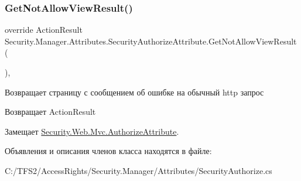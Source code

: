\subsubsection{\texorpdfstring{Get\+Not\+Allow\+View\+Result()}{GetNotAllowViewResult()}}
{\footnotesize\ttfamily override Action\+Result Security.\+Manager.\+Attributes.\+Security\+Authorize\+Attribute.\+Get\+Not\+Allow\+View\+Result (\begin{DoxyParamCaption}{ }\end{DoxyParamCaption})\hspace{0.3cm}{\ttfamily [protected]}, {\ttfamily [virtual]}}



Возвращает страницу с сообщением об ошибке на обычный http запрос 

\begin{DoxyReturn}{Возвращает}
Action\+Result
\end{DoxyReturn}


Замещает \hyperlink{class_security_1_1_web_1_1_mvc_1_1_authorize_attribute_a43392ad3d231ebb4f2e6aff6fe177029}{Security.\+Web.\+Mvc.\+Authorize\+Attribute}.



Объявления и описания членов класса находятся в файле\+:\begin{DoxyCompactItemize}
\item 
C\+:/\+T\+F\+S2/\+Access\+Rights/\+Security.\+Manager/\+Attributes/Security\+Authorize.\+cs\end{DoxyCompactItemize}
